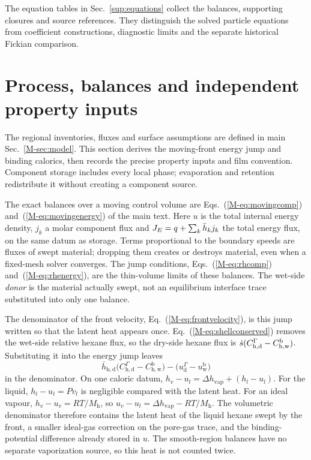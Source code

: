 \documentclass[11pt]{article}
\begin{document}
The equation tables in Sec.~\ref{sup:equations} collect the balances,
supporting closures and source references. They distinguish the solved
particle equations from coefficient constructions, diagnostic limits and
the separate historical Fickian comparison.

\section{Process, balances and independent property inputs}
\label{sup:derivations}\label{sup:ale}\label{sup:closures}
The regional inventories, fluxes and surface assumptions are defined in
main Sec.~\ref*{M-sec:model}. This section derives the moving-front energy
jump and binding calorics, then records the precise property inputs and
film convention. Component storage includes every local phase; evaporation
and retention redistribute it without creating a component source.

The exact balances over a moving control volume are
Eqs.~(\ref*{M-eq:movingcomp}) and~(\ref*{M-eq:movingenergy}) of the main
text. Here $u$ is the total internal energy density, $j_k$ a molar component
flux and $J_{E}=q+\sum_k\bar h_kj_k$ the total energy flux, on the same datum
as storage. Terms proportional to the boundary speeds are fluxes of swept
material; dropping them creates or destroys material, even when a
fixed-mesh solver converges. The jump conditions,
Eqs.~(\ref*{M-eq:rhcomp}) and~(\ref*{M-eq:rhenergy}), are the thin-volume
limits of these balances. The wet-side \emph{donor} is the material actually
swept, not an equilibrium interface trace substituted into only one balance.

The denominator of the front velocity, Eq.~(\ref*{M-eq:frontvelocity}), is this jump written so that the latent heat appears once. Eq.~(\ref*{M-eq:shellconserved}) removes the wet-side relative hexane flux, so the dry-side hexane flux is $\dot{s}(C_{\mathrm{h,d}}^{\Gamma}-C_{\mathrm{h,w}}^{\mathrm{b}})$. Substituting it into the energy jump leaves
\begin{equation}
\bar{h}_{\mathrm{h,d}}\bigl(C_{\mathrm{h,d}}^{\Gamma}-C_{\mathrm{h,w}}^{\mathrm{b}}\bigr)
-\bigl(u_{\mathrm{d}}^{\Gamma}-u_{\mathrm{w}}^{\mathrm{b}}\bigr)
\label{eq:sub:latent}
\end{equation}
in the denominator. On one caloric datum, $h_{v}-u_{l}=\Delta h_{\mathrm{vap}}+(h_{l}-u_{l})$. For the liquid, $h_{l}-u_{l}=Pv_{l}$ is negligible compared with the latent heat. For an ideal vapour, $h_{v}-u_{v}=RT/M_{\mathrm{h}}$, so $u_{v}-u_{l}=\Delta h_{\mathrm{vap}}-RT/M_{\mathrm{h}}$. The volumetric denominator therefore contains the latent heat of the liquid hexane swept by the front, a smaller ideal-gas correction on the pore-gas trace, and the binding-potential difference already stored in $u$. The smooth-region balances have no separate vaporization source, so this heat is not counted twice.
\end{document}
